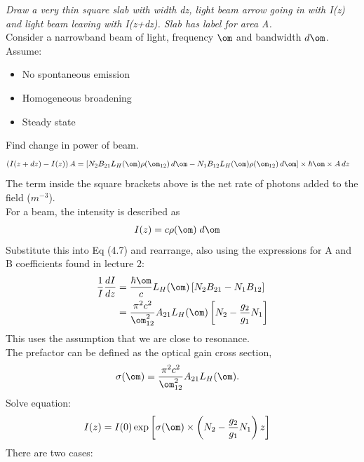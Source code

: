 \documentclass[a4paper, 11pt, normalem]{report}
\begin{document}
\textit{Draw a very thin square slab with width dz, light beam arrow going in with I(z) and light beam leaving with I(z+dz). Slab has label for area A.}\\
Consider a  narrowband beam of light, frequency $\om$ and bandwidth $d\om$. \\
Assume:
\begin{itemize}
    \item No spontaneous emission
    \item Homogeneous broadening
    \item Steady state
\end{itemize}
Find change in power of beam.
\begin{align}
    \left(I(z+dz) - I(z)\right)A &= \left[N_2B_{21}L_H(\om)\rho(\om_{12})\,d\om - N_1B_{12}L_H(\om)\rho(\om_{12})\,d\om\right]\times\hbar\om\times A\,dz
\end{align}
The term inside the square brackets above is the net rate of photons added to the field ($m^{-3}$).\\
For a beam, the intensity is described as
\begin{align}
    I(z) &= c\rho(\om)\;d\om 
\end{align}
Substitute this into Eq (4.7) and rearrange, also using the expressions for A and B coefficients found in lecture 2: 
\begin{align}
    \frac{1}{I}\frac{dI}{dz} &= \frac{\hbar\om}{c}L_H(\om)\left[N_2B_{21} - N_1B_{12}\right] \\
                             &= \frac{\pi^2c^2}{\om^2_{12}}A_{21}L_H(\om)\left[N_2 - \frac{g_2}{g_1}N_1\right]
\end{align}
This uses the assumption that we are close to resonance.\\
The prefactor can be defined as the optical gain cross section,
\begin{align}
    \sigma(\om) &= \frac{\pi^2c^2}{\om_{12}^2}A_{21}L_H(\om).
\end{align}
Solve equation:
\begin{align}
    I(z) &= I(0)\exp\left[\sigma(\om)\times\left(N_2-\frac{g_2}{g_1}N_1\right)z\right]
\end{align}
There are two cases:
\end{document}
